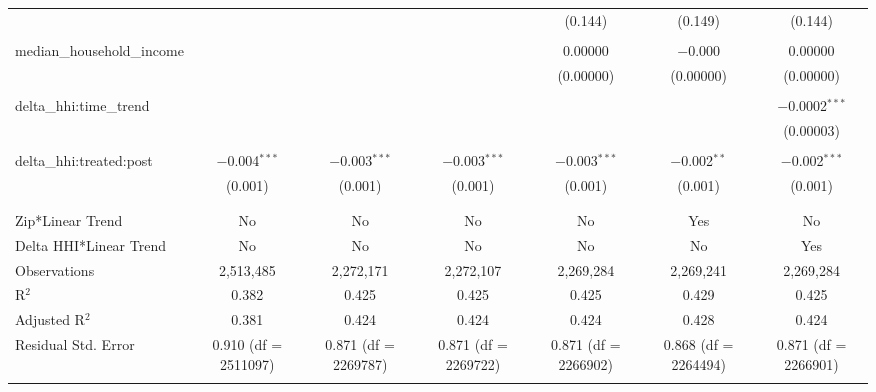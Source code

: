 \begin{table}[H]
{\begin{tabular}{@{\extracolsep{5pt}}lcccccc}
   &  &  &  & (0.144) & (0.149) & (0.144) \\  

   & & & & & & \\  

  median\_household\_income &  &  &  & 0.00000 & $-$0.000 & 0.00000 \\  

   &  &  &  & (0.00000) & (0.00000) & (0.00000) \\  

   & & & & & & \\  

  delta\_hhi:time\_trend &  &  &  &  &  & $-$0.0002$^{***}$ \\  

   &  &  &  &  &  & (0.00003) \\  

   & & & & & & \\  

  delta\_hhi:treated:post & $-$0.004$^{***}$ & $-$0.003$^{***}$ & $-$0.003$^{***}$ & $-$0.003$^{***}$ & $-$0.002$^{**}$ & $-$0.002$^{***}$ \\  

   & (0.001) & (0.001) & (0.001) & (0.001) & (0.001) & (0.001) \\  

   & & & & & & \\  

 \hline \\[-1.8ex]  

 Zip*Linear Trend & No & No & No & No & Yes & No \\  

 Delta HHI*Linear Trend & No & No & No & No & No & Yes \\  

 Observations & 2,513,485 & 2,272,171 & 2,272,107 & 2,269,284 & 2,269,241 & 2,269,284 \\  

 R$^{2}$ & 0.382 & 0.425 & 0.425 & 0.425 & 0.429 & 0.425 \\  

 Adjusted R$^{2}$ & 0.381 & 0.424 & 0.424 & 0.424 & 0.428 & 0.424 \\  

 Residual Std. Error & 0.910 (df = 2511097) & 0.871 (df = 2269787) & 0.871 (df = 2269722) & 0.871 (df = 2266902) & 0.868 (df = 2264494) & 0.871 (df = 2266901) \\  

 \hline  

 \hline \\[-1.8ex]  


\end{tabular}}
\end{table}
